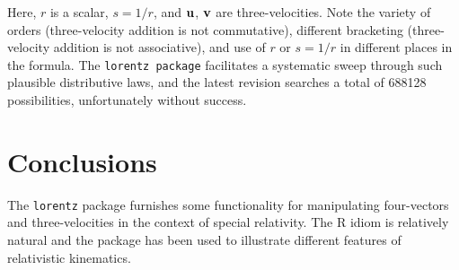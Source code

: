 \documentclass[ijoc,nonblindrev]{informs3} %
\begin{document}
Here, $r$ is a scalar, $s=1/r$, and $\mathbf u$, $\mathbf v$ are three-velocities.
Note the variety of orders (three-velocity addition is not
commutative), different bracketing (three-velocity addition is not
associative), and use of $r$ or $s=1/r$ in different places in the
formula.  The {\tt lorentz package} facilitates a systematic sweep
through such plausible distributive laws, and the latest revision
searches a total of 688128 possibilities, unfortunately without
success.

\section{Conclusions}

The {\tt lorentz} package furnishes some functionality for
manipulating four-vectors and three-velocities in the context of
special relativity.  The R idiom is relatively natural and the package
has been used to illustrate different features of relativistic
kinematics.

 



%
%
%




\end{document}
